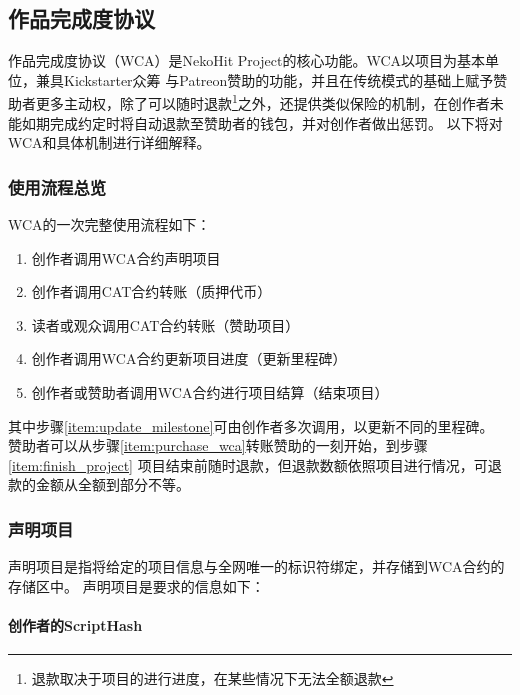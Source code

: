 \documentclass[11pt,UTF8,a4paper]{ctexart}
\begin{document}
    \subsection{作品完成度协议}\label{subsec:wca}

    作品完成度协议（WCA）是NekoHit Project的核心功能。WCA以项目为基本单位，兼具Kickstarter众筹
    与Patreon赞助的功能，并且在传统模式的基础上赋予赞助者更多主动权，除了可以随时退款\footnote{
        退款取决于项目的进行进度，在某些情况下无法全额退款
    }之外，还提供类似保险的机制，在创作者未能如期完成约定时将自动退款至赞助者的钱包，并对创作者做出惩罚。
    以下将对WCA和具体机制进行详细解释。

    \subsubsection{使用流程总览}

    WCA的一次完整使用流程如下：

    \begin{enumerate}
        \item 创作者调用WCA合约声明项目
        \item 创作者调用CAT合约转账（质押代币）
        \item 读者或观众调用CAT合约转账（赞助项目）\label{item:purchase_wca}
        \item 创作者调用WCA合约更新项目进度（更新里程碑）\label{item:update_milestone}
        \item 创作者或赞助者调用WCA合约进行项目结算（结束项目）\label{item:finish_project}
    \end{enumerate}

    其中步骤\ref{item:update_milestone}可由创作者多次调用，以更新不同的里程碑。
    赞助者可以从步骤\ref{item:purchase_wca}转账赞助的一刻开始，到步骤\ref{item:finish_project}
    项目结束前随时退款，但退款数额依照项目进行情况，可退款的金额从全额到部分不等。

    \subsubsection{声明项目}

    声明项目是指将给定的项目信息与全网唯一的标识符绑定，并存储到WCA合约的存储区中。
    声明项目是要求的信息如下：

    \paragraph{创作者的ScriptHash}
\end{document}
